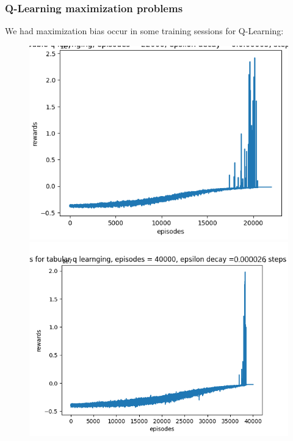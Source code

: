 \documentclass[twoside,11pt]{article}
\begin{document}
\subsubsection{Q-Learning maximization problems}
We had maximization bias occur in some training sessions for Q-Learning:
\begin{figure}[H]
\includegraphics[scale=0.5]{Rewards_Double_Q_Learning_7}
\includegraphics[scale=0.5]{Rewards_Q_Learning}
\centering
\end{figure}
\end{document}
